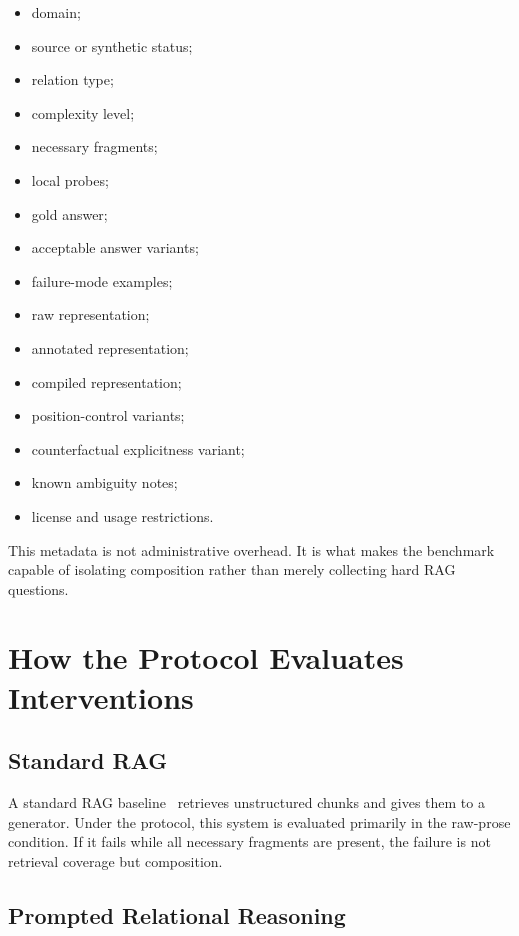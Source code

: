 \documentclass[11pt]{article}
\begin{document}
\begin{itemize}[leftmargin=*,itemsep=2pt]
    \item domain;
    \item source or synthetic status;
    \item relation type;
    \item complexity level;
    \item necessary fragments;
    \item local probes;
    \item gold answer;
    \item acceptable answer variants;
    \item failure-mode examples;
    \item raw representation;
    \item annotated representation;
    \item compiled representation;
    \item position-control variants;
    \item counterfactual explicitness variant;
    \item known ambiguity notes;
    \item license and usage restrictions.
\end{itemize}

This metadata is not administrative overhead. It is what makes the benchmark capable of isolating composition rather than merely collecting hard RAG questions.

\section{How the Protocol Evaluates Interventions}

\subsection{Standard RAG}

A standard RAG baseline~\cite{lewis2020rag} retrieves unstructured chunks and gives them to a generator. Under the protocol, this system is evaluated primarily in the raw-prose condition. If it fails while all necessary fragments are present, the failure is not retrieval coverage but composition.

\subsection{Prompted Relational Reasoning}
\end{document}
